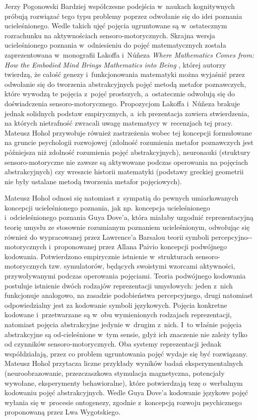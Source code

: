 \begin{newrevplenv}{Jerzy Pogonowski}
Bardziej
współczesne podejścia w~naukach kognitywnych próbują rozwiązać
tego typu problemy poprzez odwołanie się do idei poznania
ucieleśnionego. Wedle takich ujęć pojęcia ugruntowane są w~ostatecznym rozrachunku na aktywnościach sensoro-motorycznych.
Skrajna wersja ucieleśnionego poznania w~odniesieniu do pojęć
matematycznych została zaprezentowana w~monografii Lakoffa i~N\'{u}\~{n}eza {\em Where Mathematics Comes from: How the Embodied Mind Brings Mathematics into Being} \parencite{lakoff_where_2000},
której autorzy twierdzą, że całość genezy i~funkcjonowania
matematyki można wyjaśnić przez odwołanie się do tworzenia
abstrakcyjnych pojęć metodą metafor poznawczych, które wywodzą te
pojęcia z~pojęć prostszych, a~ostatecznie odwołują się do
doświadczenia sensoro-motorycznego. Propozycjom Lakoffa i~N\'{u}\~{n}eza brakuje jednak solidnych podstaw empirycznych, a~ich prezentacja zawiera stwierdzenia, na których nietrafność
zwracali uwagę matematycy w~recenzjach tej pracy. Mateusz Hohol
przywołuje również zastrzeżenia wobec tej koncepcji formułowane na
gruncie psychologii rozwojowej (zdolność rozumienia metafor
poznawczych jest późniejsza niż zdolność rozumienia pojęć
abstrakcyjnych), neuronauki (struktury sensoro-motoryczne nie
zawsze są aktywowane podczas operowania na pojęciach
abstrakcyjnych) czy wreszcie historii matematyki (podstawy
greckiej geometrii nie były ustalane metodą tworzenia metafor
pojęciowych). 

Mateusz Hohol odnosi się natomiast z~sympatią do
pewnych umiarkowanych koncepcji ucieleśnionego poznania, jak np.
koncepcja ucieleśnionego i~odcieleśnionego poznania Guya Dove'a,
która miałaby uzgodnić reprezentacyjną teorię umysłu ze stosownie
rozumianym poznaniem ucieleśnionym, odwołując się również do
wypracowanej przez Lawrence'a Barsalou teorii symboli
percepcyjno-\mbox{-motorycznych} i~proponowanej przez Allana Paivio
koncepcji podwójnego kodowania. Potwierdzono empirycznie istnienie
w~strukturach sensoro-motorycznych tzw. symulatorów, będących
swoistymi wzorcami aktywności, przywoływanymi podczas operowania
pojęciami. Teoria podwójnego kodowania postuluje istnienie dwóch
rodzajów reprezentacji umysłowych: jeden z~nich funkcjonuje
analogowo, na zasadzie podobieństwa percepcyjnego, drugi natomiast
odpowiedzialny jest za kodowanie symboli językowych. Pojęcia
konkretne kodowane i~przetwarzane są w~obu wymienionych rodzajach
reprezentacji, natomiast pojęcia abstrakcyjne jedynie w~drugim z~nich. I~to właśnie pojęcia abstrakcyjne są od-cieleśnione w~tym
sensie, gdyż ich znaczenie nie zależy tylko od czynników
sensoro-motorycznych. Oba systemy reprezentacji jednak
współdziałają, przez co problem ugruntowania pojęć wydaje się być
rozwiązany. Mateusz Hohol przytacza liczne przykłady wyników badań
eksperymentalnych (neuroobrazowanie, przezczaszkowa stymulacja
magnetyczna, potencjały wywołane, eksperymenty behawioralne),
które potwierdzają tezę o~werbalnym kodowaniu pojęć
abstrakcyjnych. Wedle Guya Dove'a kodowanie językowe pojęć wyłania
się w~procesie ontogenezy, zgodnie z~koncepcją rozwoju
psychicznego proponowaną przez Lwa Wygotskiego.


\end{newrevplenv}
